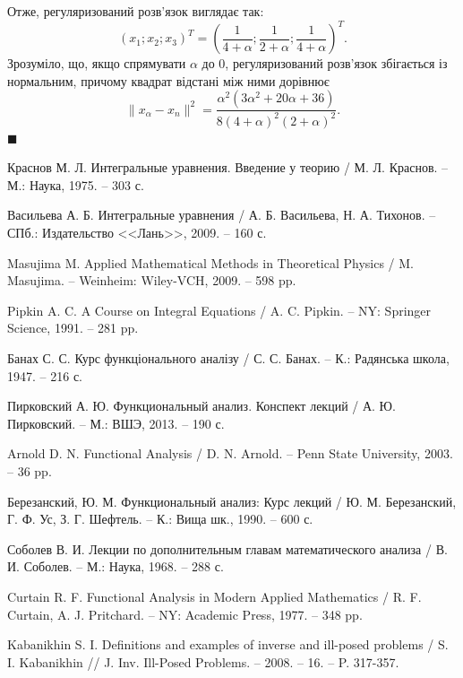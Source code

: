 \documentclass[14pt,twoside]{extreport}
\theoremstyle{mystyle}
\numberwithin{equation}{chapter}
\begin{document}
\begin{small}
Отже, регуляризований розв'язок виглядає так:
\[
\left(x_1; x_2; x_3\right)^T = \left(\dfrac{1}{4+\alpha}; \dfrac{1}{2+\alpha}; \dfrac{1}{4 + \alpha}\right)^T.
\]
Зрозуміло, що, якщо спрямувати $\alpha$ до $0$, регуляризований розв'язок збігається із нормальним, причому квадрат відстані між ними дорівнює
\[
 \|x_{\alpha} - x_n\|^2 = \dfrac{\alpha^2(3\alpha^2 + 20\alpha + 36)}{8(4+\alpha)^2(2+\alpha)^2}.
\]
$\blacksquare$
\end{small}

\printindex

\begin{thebibliography}{20}
	
 Краснов М. Л. Интегральные уравнения. Введение у теорию / М. Л. Краснов. -- М.: Наука, 1975. -- 303 с.

 Васильева А. Б. Интегральные уравнения / А. Б. Васильева, Н. А. Тихонов. -- СПб.: Издательство <<Лань>>, 2009. -- 160 с.

 Masujima M. Applied Mathematical Methods in Theoretical Physics / M. Masujima. -- Weinheim: Wiley-VCH, 2009. -- 598 pp.

 Pipkin A. C. A Course on Integral Equations / A. C. Pipkin. -- NY: Springer Science, 1991. -- 281 pp.

 Банах С. С. Курс функціонального аналізу / С. С. Банах. -- К.: Радянська школа, 1947. -- 216 с.

 Пирковский А. Ю. Функциональный анализ. Конспект лекций / А. Ю. Пирковский. -- М.: ВШЭ, 2013. -- 190 с.

 Arnold D. N. Functional Analysis / D. N. Arnold. -- Penn State University, 2003. -- 36 pp.

 Березанский, Ю. М. Функциональный анализ: Курс лекций / Ю. М. Березанский, Г. Ф. Ус, З. Г. Шефтель. – К.: Вища шк., 1990. – 600 с.

 Соболев В. И. Лекции по дополнительным главам математического анализа / В. И. Соболев. -- М.: Наука, 1968. -- 288 с.

 Curtain R. F. Functional Analysis in  Modern Applied Mathematics / R. F. Curtain, A. J. Pritchard. -- NY: Academic Press, 1977. -- 348 pp.

 Kabanikhin S. I. Definitions and examples of inverse and ill-posed problems / S. I. Kabanikhin // J. Inv. Ill-Posed Problems. -- 2008. -- 16. -- P. 317-357.


\end{thebibliography}
\end{document}
